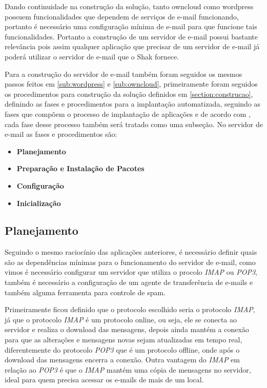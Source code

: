 Dando continuidade na construção da solução, tanto owncloud como wordpress
possuem funcionalidades que dependem de serviços de e-mail funcionando, portanto
é necessário uma configuração mínima de e-mail para que funcione tais funcionalidades.
Portanto a construção de um servidor de e-mail possui bastante relevância pois
assim qualquer aplicação que precisar de um servidor de e-mail já poderá utilizar
o servidor de e-mail que o Shak fornece.

Para a construção do servidor de e-mail também foram seguidos os mesmos passos
feitos em \ref{sub:wordpress} e \ref{sub:owncloud}, primeiramente foram seguidos os
procedimentos para construção da solução definidos em \ref{section:construcao},
definindo as fases e procedimentos para a implantação automatizada, seguindo as
fases que compõem o processo de implantação de aplicações e de acordo com \cite{omg2006},
cada fase desse processo também será tratado como uma subseção. No servidor de e-mail
as fases e procedimentos são:

 \begin{itemize}
   \item  \textbf{Planejamento}
   \item  \textbf{Preparação e Instalação de Pacotes}
   \item  \textbf{Configuração}
   \item  \textbf{Inicialização}
 \end{itemize}

\subsection{Planejamento}

Seguindo o mesmo raciocínio das aplicações anteriores, é necessário definir
quais são as dependências mínimas para o funcionamento do servidor de e-mail,
como vimos é necessário configurar um servidor que utiliza o procolo \textit{IMAP} ou \textit{POP3},
também é necessário a configuração de um agente de transferência de e-mails e também
alguma ferramenta para controle de spam.

Primeiramente ficou definido que o protocolo escolhido seria o protocolo \textit{IMAP}, já
que o protocolo \textit{IMAP} é um protocolo online, ou seja, ele se conecta ao servidor
e realiza o download das mensagens, depois ainda  mantém a conexão para que
as alterações e mensagens novas sejam atualizadas em tempo real, diferentemente do
protocolo \textit{POP3} que é um protocolo offline, onde após o download das mensagens encerra
a conexão. Outra vantagem do \textit{IMAP} em relação ao \textit{POP3} é que o \textit{IMAP} mantém uma cópia
de mensagens no servidor, ideal para quem precisa acessar os e-mails de mais de um local.

